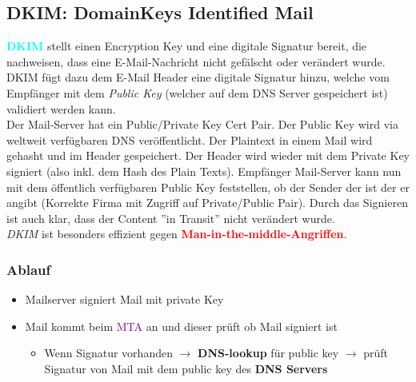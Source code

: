 \subsection{DKIM: DomainKeys Identified Mail}
\textcolor{cyan}{\textbf{DKIM}} stellt einen Encryption Key und eine digitale Signatur bereit, die nachweisen, dass eine E-Mail-Nachricht nicht gefälscht oder verändert wurde.
DKIM fügt dazu dem E-Mail Header eine digitale Signatur hinzu, welche vom Empfänger mit dem \textit{Public Key} (welcher auf dem DNS Server gespeichert ist) validiert werden kann.\\

Der Mail-Server hat ein Public/Private Key Cert Pair. Der Public Key wird via weltweit verfügbaren DNS veröffentlicht. 
Der Plaintext in einem Mail wird gehasht und im Header gespeichert. 
Der Header wird wieder mit dem Private Key signiert (also inkl. dem Hash des Plain Texts). 
Empfänger Mail-Server kann nun mit dem öffentlich verfügbaren Public Key feststellen, ob der Sender der ist der er angibt (Korrekte Firma mit Zugriff auf Private/Public Pair). 
Durch das Signieren ist auch klar, dass der Content ''in Transit'' nicht verändert wurde.\\

\textit{DKIM} ist besonders effizient gegen \textcolor{red}{\textbf{Man-in-the-middle-Angriffen}}.

\subsubsection{Ablauf}
\begin{itemize}
    \item Mailserver signiert Mail mit private Key
    \item Mail kommt beim  \textcolor{purple}{MTA} an und dieser prüft ob Mail signiert ist
    \begin{itemize}
        \item Wenn Signatur vorhanden $\rightarrow$ \textbf{DNS-lookup} für public key $\rightarrow$ prüft Signatur von Mail mit dem public key des \textbf{DNS Servers}\\
    \end{itemize}
\end{itemize}


